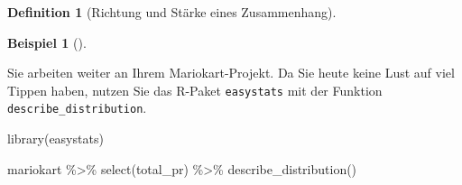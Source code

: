 \documentclass[
  a4paper,
  DIV=11]{scrreprt}
\newenvironment{Shaded}{\begin{snugshade}}{\end{snugshade}}
\newcommand{\FunctionTok}[1]{\textcolor[rgb]{0.28,0.35,0.67}{#1}}
\newcommand{\NormalTok}[1]{\textcolor[rgb]{0.00,0.23,0.31}{#1}}
\newcommand{\SpecialCharTok}[1]{\textcolor[rgb]{0.37,0.37,0.37}{#1}}
\theoremstyle{definition}
\theoremstyle{definition}
\newtheorem{example}{Beispiel}[chapter]
\theoremstyle{definition}
\newtheorem{definition}{Definition}[chapter]
\theoremstyle{remark}
\begin{document}
\begin{definition}[Richtung und Stärke eines
Zusammenhang]
\begin{example}[]\protect\hypertarget{exm-sd-mario}{}\label{exm-sd-mario}

Sie arbeiten weiter an Ihrem Mariokart-Projekt. Da Sie heute keine Lust
auf viel Tippen haben, nutzen Sie das R-Paket \texttt{easystats} mit der
Funktion \texttt{describe\_distribution}.

\begin{Shaded}
\begin{Highlighting}[]
\FunctionTok{library}\NormalTok{(easystats)}

\NormalTok{mariokart }\SpecialCharTok{\%\textgreater{}\%} 
  \FunctionTok{select}\NormalTok{(total\_pr) }\SpecialCharTok{\%\textgreater{}\%} 
  \FunctionTok{describe\_distribution}\NormalTok{()}
\end{Highlighting}
\end{Shaded}


\end{example}
\end{definition}
\end{document}

